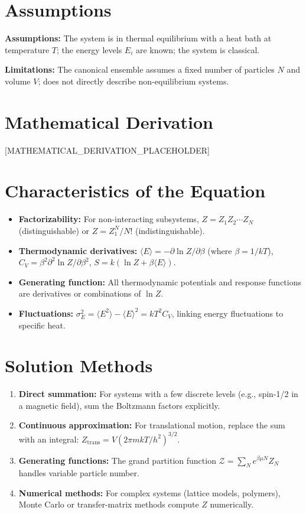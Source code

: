 \documentclass[11pt,openright]{book}
\begin{document}
\section*{Assumptions}

\textbf{Assumptions:} The system is in thermal equilibrium with a heat bath at temperature $T$; the energy levels $E_{i}$ are known; the system is classical.


\textbf{Limitations:} The canonical ensemble assumes a fixed number of particles $N$ and volume $V$; does not directly describe non-equilibrium systems.


\section*{Mathematical Derivation}

[MATHEMATICAL_DERIVATION_PLACEHOLDER]

\section*{Characteristics of the Equation}

\begin{itemize}
  \item \textbf{Factorizability:} For non-interacting subsystems, $Z = Z_{1}Z_{2}\cdots Z_{N}$ (distinguishable) or $Z = Z_{1}^{N}/N!$ (indistinguishable).
  \item \textbf{Thermodynamic derivatives:} $\langle E\rangle = -\partial\ln Z/\partial\beta$ (where $\beta = 1/kT$), $C_{V} = \beta^{2}\partial^{2}\ln Z/\partial\beta^{2}$, $S = k(\ln Z + \beta\langle E\rangle)$.
  \item \textbf{Generating function:} All thermodynamic potentials and response functions are derivatives or combinations of $\ln Z$.
  \item \textbf{Fluctuations:} $\sigma_{E}^{2} = \langle E^{2}\rangle - \langle E\rangle^{2} = kT^{2}C_{V}$, linking energy fluctuations to specific heat.
\end{itemize}
\section*{Solution Methods}

\begin{enumerate}
  \item \textbf{Direct summation:} For systems with a few discrete levels (e.g., spin-1/2 in a magnetic field), sum the Boltzmann factors explicitly.
  \item \textbf{Continuous approximation:} For translational motion, replace the sum with an integral: $Z_{\text{trans}} = V(2\pi mkT/h^{2})^{3/2}$.
  \item \textbf{Generating functions:} The grand partition function $\mathcal{Z} = \sum_{N} e^{\beta\mu N}Z_{N}$ handles variable particle number.
  \item \textbf{Numerical methods:} For complex systems (lattice models, polymers), Monte Carlo or transfer-matrix methods compute $Z$ numerically.
\end{enumerate}
\end{document}
